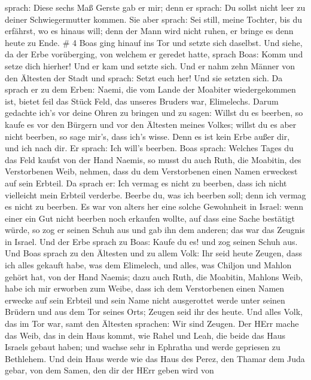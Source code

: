 sprach: Diese sechs Maß Gerste gab er mir; denn er sprach: Du sollst
nicht leer zu deiner Schwiegermutter kommen.  Sie aber
sprach: Sei still, meine Tochter, bis du erfährst, wo es hinaus will;
denn der Mann wird nicht ruhen, er bringe es denn heute zu Ende. \# 4
 Boas ging hinauf ins Tor und setzte sich daselbst. Und
siehe, da der Erbe vorüberging, von welchem er geredet hatte, sprach
Boas: Komm und setze dich hierher! Und er kam und setzte sich.
 Und er nahm zehn Männer von den Ältesten der Stadt und
sprach: Setzt euch her! Und sie setzten sich.  Da sprach er
zu dem Erben: Naemi, die vom Lande der Moabiter wiedergekommen ist,
bietet feil das Stück Feld, das unseres Bruders war, Elimelechs.
 Darum gedachte ich's vor deine Ohren zu bringen und zu
sagen: Willst du es beerben, so kaufe es vor den Bürgern und vor den
Ältesten meines Volkes; willst du es aber nicht beerben, so sage mir's,
dass ich's wisse. Denn es ist kein Erbe außer dir, und ich nach dir. Er
sprach: Ich will's beerben.  Boas sprach: Welches Tages du
das Feld kaufst von der Hand Naemis, so musst du auch Ruth, die
Moabitin, des Verstorbenen Weib, nehmen, dass du dem Verstorbenen einen
Namen erweckest auf sein Erbteil.  Da sprach er: Ich vermag
es nicht zu beerben, dass ich nicht vielleicht mein Erbteil verderbe.
Beerbe du, was ich beerben soll; denn ich vermag es nicht zu beerben.
 Es war von alters her eine solche Gewohnheit in Israel:
wenn einer ein Gut nicht beerben noch erkaufen wollte, auf dass eine
Sache bestätigt würde, so zog er seinen Schuh aus und gab ihn dem
anderen; das war das Zeugnis in Israel.  Und der Erbe sprach
zu Boas: Kaufe du es! und zog seinen Schuh aus.  Und Boas
sprach zu den Ältesten und zu allem Volk: Ihr seid heute Zeugen, dass
ich alles gekauft habe, was dem Elimelech, und alles, was Chiljon und
Mahlon gehört hat, von der Hand Naemis;  dazu auch Ruth,
die Moabitin, Mahlons Weib, habe ich mir erworben zum Weibe, dass ich
dem Verstorbenen einen Namen erwecke auf sein Erbteil und sein Name
nicht ausgerottet werde unter seinen Brüdern und aus dem Tor seines
Orts; Zeugen seid ihr des heute.  Und alles Volk, das im
Tor war, samt den Ältesten sprachen: Wir sind Zeugen. Der HErr mache das
Weib, das in dein Haus kommt, wie Rahel und Leah, die beide das Haus
Israels gebaut haben; und wachse sehr in Ephratha und werde gepriesen zu
Bethlehem.  Und dein Haus werde wie das Haus des Perez, den
Thamar dem Juda gebar, von dem Samen, den dir der HErr geben wird von
